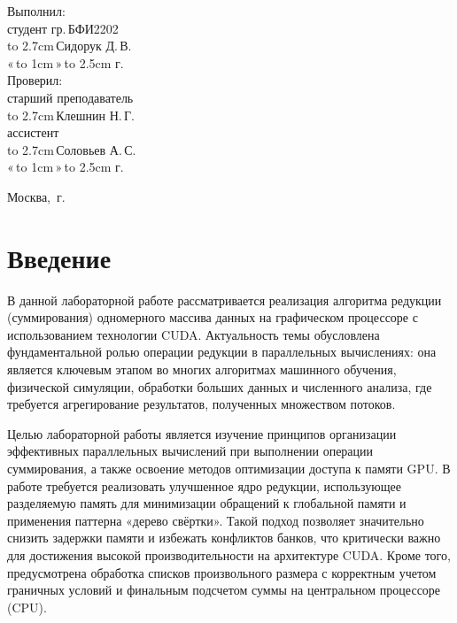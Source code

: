 \documentclass[14pt]{extarticle}
\makeatletter
\newcommand{\hrf}[1]{\hbox to #1{\hrulefill}} %
\newcounter{sectionc} %
\newcommand{\numbersections}{\renewcommand{\Hy@numberline}[1]{##1~}}
\newcommand{\nonumbersections}{\renewcommand{\Hy@numberline}[1]{}}
\let\oldsection\section
\renewcommand{\section}{\numbersections\oldsection}
\let\oldsectionc\sectionc
\renewcommand{\sectionc}{\nonumbersections\oldsectionc}
\renewcommand\tableofcontents{
	\pdfbookmark[sectionc]{\contentsname}{toc} %
	\sectionc*{\contentsname
		\@mkboth{\contentsname}{\contentsname}}
	\@starttoc{toc}
}
\makeatother
\begin{document}
\vfill %

\hfill %
\begin{minipage}{0.45\textwidth} %
	Выполнил:\\[2mm]
	студент гр.\,БФИ2202\\[2mm]
	\hrf{2.7cm}\,Сидорук Д.\,В.\\[2mm]
	«\,\hrf{1cm}\,»\,\hrf{2.5cm}\,\the\year{}\,г.\\[5mm]
	
	Проверил:\\[2mm]
	старший преподаватель\\[2mm]
	\hrf{2.7cm}\,Клешнин Н.\,Г.\\[2mm]
	ассистент\\[2mm]
	\hrf{2.7cm}\,Соловьев А.\,С.\\[2mm]
	«\,\hrf{1cm}\,»\,\hrf{2.5cm}\,\the\year{}\,г.
\end{minipage}%

\vfill

\centerline{Москва, \the\year{}\,г.} %
\thispagestyle{empty} %
\newpage %
\tableofcontents %
\newpage %

\section{Введение}

В данной лабораторной работе рассматривается реализация алгоритма редукции (суммирования) одномерного массива данных на графическом процессоре с использованием технологии CUDA. Актуальность темы обусловлена фундаментальной ролью операции редукции в параллельных вычислениях: она является ключевым этапом во многих алгоритмах машинного обучения, физической симуляции, обработки больших данных и численного анализа, где требуется агрегирование результатов, полученных множеством потоков.

Целью лабораторной работы является изучение принципов организации эффективных параллельных вычислений при выполнении операции суммирования, а также освоение методов оптимизации доступа к памяти GPU. В работе требуется реализовать улучшенное ядро редукции, использующее разделяемую память для минимизации обращений к глобальной памяти и применения паттерна «дерево свёртки». Такой подход позволяет значительно снизить задержки памяти и избежать конфликтов банков, что критически важно для достижения высокой производительности на архитектуре CUDA. Кроме того, предусмотрена обработка списков произвольного размера с корректным учетом граничных условий и финальным подсчетом суммы на центральном процессоре (CPU).
\end{document}

